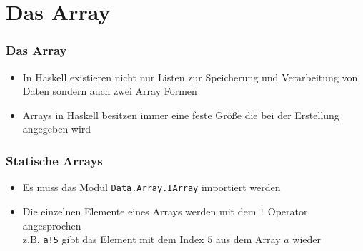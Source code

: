 \subtitle{Tag vier - ein bisschen noch} 
\date{28.03.2014}

\begin{frame}[plain]
\titlepage
\end{frame}

\section{Das Array}
\begin{frame}
\frametitle{Das Array}
\begin{block}{\vspace*{-3ex}}
\begin{itemize}
	\item In Haskell existieren nicht nur Listen zur Speicherung und Verarbeitung von Daten sondern auch zwei Array Formen
	\item Arrays in Haskell besitzen immer eine feste Größe die bei der Erstellung angegeben wird
\end{itemize}
\end{block}
\end{frame}

\begin{frame}
\frametitle{Statische Arrays}
\begin{block}{\vspace*{-3ex}}
\begin{itemize}
	\item Es muss das Modul \lstinline|Data.Array.IArray| importiert werden
	\item Die einzelnen Elemente eines Arrays werden mit dem \lstinline|!| Operator angesprochen\\ z.B. \lstinline|a!5| gibt das Element mit dem Index $5$ aus dem Array $a$ wieder 
\end{itemize}
\end{block}
\end{frame}

